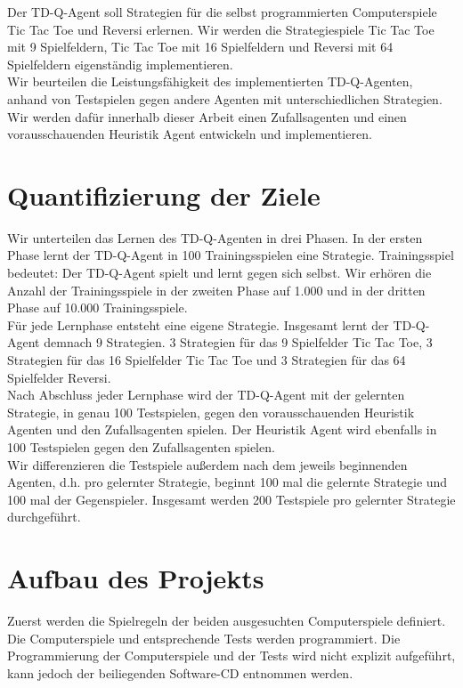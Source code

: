 Der TD-Q-Agent soll Strategien für die selbst programmierten Computerspiele Tic Tac Toe und Reversi erlernen. Wir werden die Strategiespiele Tic Tac Toe mit 9 Spielfeldern, Tic Tac Toe mit 16 Spielfeldern und Reversi mit 64 Spielfeldern eigenständig implementieren. \\

Wir beurteilen die Leistungsfähigkeit des implementierten TD-Q-Agenten, anhand von Testspielen gegen andere Agenten mit unterschiedlichen Strategien. Wir werden dafür innerhalb dieser Arbeit einen Zufallsagenten und einen vorausschauenden Heuristik Agent entwickeln und implementieren. \\

\section{Quantifizierung der Ziele}
\label{sec:Quantifizierung der Ziele}

Wir unterteilen das Lernen des TD-Q-Agenten in drei Phasen. In der ersten Phase lernt der TD-Q-Agent in 100 Trainingsspielen eine Strategie. Trainingsspiel bedeutet: Der TD-Q-Agent spielt und lernt gegen sich selbst. Wir erhören die Anzahl der Trainingsspiele in der zweiten Phase auf 1.000 und in der dritten Phase auf 10.000 Trainingsspiele. \\

Für jede Lernphase entsteht eine eigene Strategie. Insgesamt lernt der TD-Q-Agent demnach 9 Strategien. 3 Strategien für das 9 Spielfelder Tic Tac Toe, 3 Strategien für das 16 Spielfelder Tic Tac Toe und 3 Strategien für das 64 Spielfelder Reversi. \\

Nach Abschluss jeder Lernphase wird der TD-Q-Agent mit der gelernten Strategie, in genau 100 Testspielen, gegen den vorausschauenden Heuristik Agenten und den Zufallsagenten spielen. Der Heuristik Agent wird ebenfalls in 100 Testspielen gegen den Zufallsagenten spielen. \\

Wir differenzieren die Testspiele außerdem nach dem jeweils beginnenden Agenten, d.h. pro gelernter Strategie, beginnt 100 mal die gelernte Strategie und 100 mal der Gegenspieler. Insgesamt werden 200 Testspiele pro gelernter Strategie durchgeführt. \\


\section{Aufbau des Projekts}
Zuerst werden die Spielregeln der beiden ausgesuchten Computerspiele definiert. Die Computerspiele und entsprechende Tests werden programmiert. Die Programmierung der Computerspiele und der Tests wird nicht explizit aufgeführt, kann jedoch der beiliegenden Software-CD entnommen werden. \\

